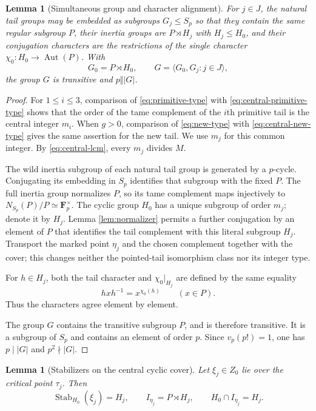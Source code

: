 \documentclass[10pt,a4paper]{amsart}
\newtheorem{lemma}[theorem]{Lemma}
\numberwithin{equation}{section}
\begin{document}
\begin{lemma}[Simultaneous group and character alignment]
\label{lem:group-alignment}
For $j\in J$, the natural tail groups may be embedded as subgroups
$G_j\leq S_p$ so that
they contain the same regular subgroup $P$, their inertia groups are
$P\rtimes H_j$ with $H_j\leq H_0$, and their conjugation characters are
the restrictions of the single character
$\chi_0:H_0\to\operatorname{Aut}(P)$.  With
\[
 G_0=P\rtimes H_0,\qquad
 G=\langle G_0,G_j:j\in J\rangle,
\]
the group $G$ is transitive and $p\Vert |G|$.
\end{lemma}

\begin{proof}
For $1\leq i\leq3$, comparison of
\eqref{eq:primitive-type} with
\eqref{eq:central-primitive-type} shows that the order of the tame
complement of the $i$th primitive tail is the central integer $m_i$.
When $g>0$, comparison of \eqref{eq:new-type} with
\eqref{eq:central-new-type} gives the same assertion for the new tail.
We use $m_j$ for this common integer.  By
\eqref{eq:central-lcm}, every $m_j$ divides $M$.

The wild inertia subgroup of each natural tail group is generated by a
$p$-cycle.  Conjugating its embedding in $S_p$ identifies that subgroup
with the fixed $P$.  The full inertia group normalizes $P$, so its tame
complement maps injectively to
$N_{S_p}(P)/P\simeq\mathbf F_p^\times$.  The cyclic group
$H_0$ has a unique subgroup of order $m_j$; denote it by $H_j$.  Lemma
\ref{lem:normalizer} permits a further conjugation by an element of $P$ that
identifies the tail complement with this literal subgroup $H_j$.  Transport
the marked point $\eta_j$ and the chosen complement together with the
cover; this changes neither the pointed-tail isomorphism class nor its
integer type.

For $h\in H_j$, both the tail character and $\chi_0|_{H_j}$ are defined by
the same equality
\[
 hxh^{-1}=x^{\chi_0(h)}\qquad(x\in P).
\]
Thus the characters agree element by element.

The group $G$ contains the transitive subgroup $P$, and is therefore
transitive.  It is a subgroup of $S_p$ and contains an element of order $p$.
Since $v_p(p!)=1$, one has $p\mid |G|$ and $p^2\nmid |G|$.
\end{proof}

\begin{lemma}[Stabilizers on the central cyclic cover]
\label{lem:central-stabilizers}
Let $\xi_j\in Z_0$ lie over the critical point $\tau_j$.  Then
\[
 \operatorname{Stab}_{H_0}(\xi_j)=H_j,
 \qquad I_{\eta_j}=P\rtimes H_j,
 \qquad H_0\cap I_{\eta_j}=H_j.
\]
\end{lemma}
\end{document}
